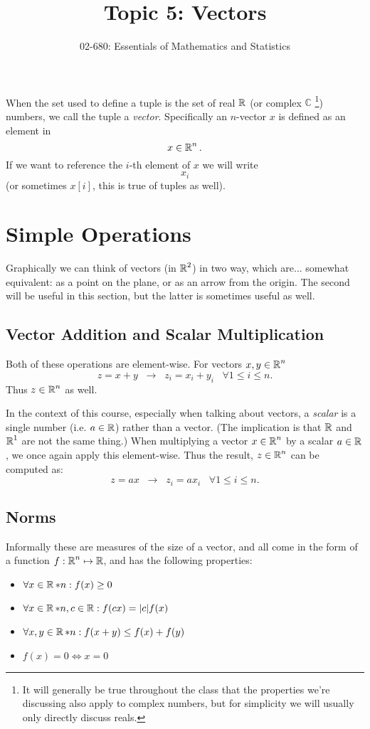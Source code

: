 


\title{Topic 5: Vectors}
\author{02-680: Essentials of Mathematics and Statistics}


\maketitle

When the set used to define a tuple is the set of real $\operatorname{\mathbb{R}}$ (or complex $\mathbb{C}$%
\footnote{It will generally be true throughout the class that the properties we're discussing also apply to complex numbers, but for simplicity we will usually only directly discuss reals.})
numbers, we call the tuple a \emph{vector}.
Specifically an $n$-vector $x$ is defined as an element in \[x\in \operatorname{\mathbb{R}}^n.\] 
If we want to reference the $i$-th element of $x$ we will write \[x_i\] (or sometimes $x[i]$, this is true of tuples as well).

\section{Simple Operations}
Graphically we can think of vectors (in $\operatorname{\mathbb{R}}^2$) in two way, which are... somewhat equivalent: 
as a point on the plane, or as an arrow from the origin.
The second will be useful in this section, but the latter is sometimes useful as well. 


\subsection{Vector Addition and Scalar Multiplication}
Both of these operations are element-wise. 
For vectors $x,y \in \operatorname{\mathbb{R}}^n$
\[
z = x+y \;\;\rightarrow \;\; z_i = x_i + y_i \;\;\; \forall 1 \le i \le n.
\]
Thus $z \in \operatorname{\mathbb{R}}^n$ as well. 

In the context of this course, especially when talking about vectors, a \emph{scalar} is a single number (i.e. $a \in \operatorname{\mathbb{R}}$) rather than a vector. 
(The implication is that $\operatorname{\mathbb{R}}$ and $\operatorname{\mathbb{R}}^1$ are not the same thing.)
When multiplying a vector $x\in \operatorname{\mathbb{R}}^n$ by a scalar $a\in\operatorname{\mathbb{R}}$, we once again apply this element-wise. 
Thus the result, $z\in\operatorname{\mathbb{R}}^n$ can be computed as:
\[
z = ax \;\; \rightarrow \;\; z_i = a x_i \;\;\; \forall 1 \le i \le n.
\]

\subsection{Norms}
Informally these are measures of the size of a vector, and all come in the form of a function $f: \operatorname{\mathbb{R}}^n \mapsto \operatorname{\mathbb{R}}$, and has the following properties:
\begin{itemize}
\item $\forall x \in \operatorname{\mathbb{R}}*n : f(x)\ge 0$
\item $\forall x \in \operatorname{\mathbb{R}}*n, c\in\operatorname{\mathbb{R}} : f(cx) = |c|f(x)$ 
\item $\forall x,y \in \operatorname{\mathbb{R}}*n : f(x+y)\le f(x) + f(y)$
\item $f(x) = 0 \iff x=0$
\end{itemize}

